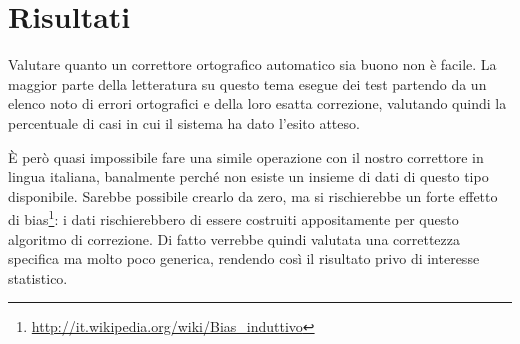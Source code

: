 \chapter{Risultati}
Valutare quanto un correttore ortografico automatico sia buono non è facile. La maggior parte della letteratura su questo tema esegue dei test partendo da un elenco noto di errori ortografici e della loro esatta correzione, valutando quindi la percentuale di casi in cui il sistema ha dato l'esito atteso.

È però quasi impossibile fare una simile operazione con il nostro correttore in lingua italiana, banalmente perché non esiste un insieme di dati di questo tipo disponibile. Sarebbe possibile crearlo da zero, ma si rischierebbe un forte effetto di bias\footnote{\url{http://it.wikipedia.org/wiki/Bias_induttivo}}: i dati rischierebbero di essere costruiti appositamente per questo algoritmo di correzione. Di fatto verrebbe quindi valutata una correttezza specifica ma molto poco generica, rendendo così il risultato privo di interesse statistico.

